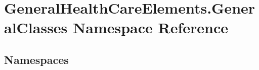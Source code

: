 \hypertarget{namespace_general_health_care_elements_1_1_general_classes}{}\section{General\+Health\+Care\+Elements.\+General\+Classes Namespace Reference}
\label{namespace_general_health_care_elements_1_1_general_classes}
\subsection*{Namespaces}
\begin{DoxyCompactItemize}
\end{DoxyCompactItemize}
